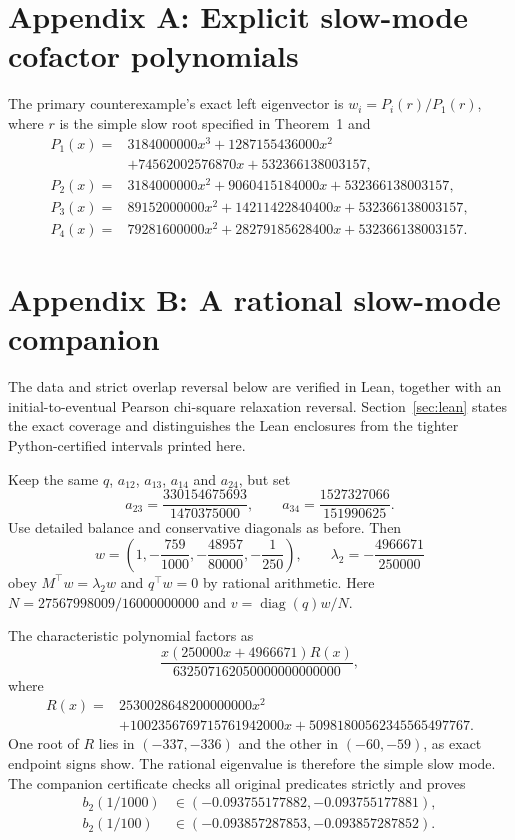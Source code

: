 \documentclass[11pt]{article}
\newcommand{\diag}{\operatorname{diag}}
\begin{document}
\section*{Appendix A: Explicit slow-mode cofactor polynomials}\label{app:cofactors}
The primary counterexample's exact left eigenvector is $w_i=P_i(r)/P_1(r)$, where $r$ is the simple slow root specified in Theorem~1 and
\begin{align*}
P_1(x)={}&3184000000x^3+1287155436000x^2\\
&+74562002576870x+532366138003157,\\
P_2(x)={}&3184000000x^2+9060415184000x+532366138003157,\\
P_3(x)={}&89152000000x^2+14211422840400x+532366138003157,\\
P_4(x)={}&79281600000x^2+28279185628400x+532366138003157.
\end{align*}

\section*{Appendix B: A rational slow-mode companion}\label{app:rational}
The data and strict overlap reversal below are verified in Lean, together with an initial-to-eventual Pearson chi-square relaxation reversal. Section~\ref{sec:lean} states the exact coverage and distinguishes the Lean enclosures from the tighter Python-certified intervals printed here.

Keep the same $q$, $a_{12}$, $a_{13}$, $a_{14}$ and $a_{24}$, but set
\[
a_{23}=\frac{330154675693}{1470375000},\qquad
 a_{34}=\frac{1527327066}{151990625}.
\]
Use detailed balance and conservative diagonals as before. Then
\[
w=\left(1,-\frac{759}{1000},-\frac{48957}{80000},-\frac1{250}\right),
\qquad \lambda_2=-\frac{4966671}{250000}
\]
obey $M^\top w=\lambda_2w$ and $q^\top w=0$ by rational arithmetic. Here $N=27567998009/16000000000$ and $v=\diag(q)w/N$.

The characteristic polynomial factors as
\[
\frac{x(250000x+4966671)R(x)}{632507162050000000000000},
\]
where
\begin{align*}
R(x)={}&2530028648200000000x^2\\
&+1002356769715761942000x+50981800562345565497767.
\end{align*}
One root of $R$ lies in $(-337,-336)$ and the other in $(-60,-59)$, as exact endpoint signs show. The rational eigenvalue is therefore the simple slow mode. The companion certificate checks all original predicates strictly and proves
\begin{align*}
b_2(1/1000)&\in(-0.093755177882,-0.093755177881),\\
b_2(1/100)&\in(-0.093857287853,-0.093857287852).
\end{align*}
\end{document}
